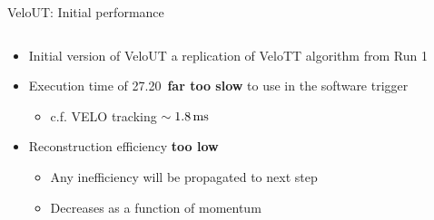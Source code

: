 \documentclass[aspectratio=1610]{beamer}
\begin{document}
\begin{frame}{VeloUT: Initial performance}

\begin{columns}
\begin{column}{0.65\textwidth}

\begin{itemize}
  \item Initial version of VeloUT a replication of VeloTT algorithm from Run 1
\end{itemize}

\begin{itemize}
  \item Execution time of 27.20\ms ~{\bf far too slow} to use in the software trigger
  \begin{itemize}
    \item[\ding{70}] c.f. VELO tracking $\sim1.8{\mathrm{ \,ms}}$
  \end{itemize}
  \item Reconstruction efficiency {\bf too low}
  \begin{itemize}
    \item[\ding{70}] Any inefficiency will be propagated to next step
    \item[\ding{70}] Decreases as a function of momentum
  \end{itemize}
\end{itemize}

\bigskip

\begin{mdframed}[linecolor=barcolor]
\begin{center}
\end{center}
\end{mdframed}
\end{column}


\end{columns}
\end{frame}
\end{document}
